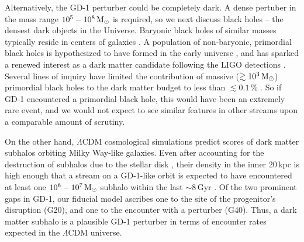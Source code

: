 \documentclass[twocolumn]{aastex62}
\begin{document}
Alternatively, the GD-1 perturber could be completely dark.
A dense pertuber in the mass range $10^5-10^8\,\rm M_\odot$ is required, so we next discuss black holes -- the densest dark objects in the Universe.
Baryonic black holes of similar masses typically reside in centers of galaxies \citep[the mass of Milky Way's supermassive black hole, Sgr A$^\star$, is $\approx4\times10^6\,\rm M_\odot$][]{boehle2016}.
A population of non-baryonic, primordial black holes is hypothesized to have formed in the early universe \citep{carr1974}, and has sparked a renewed interest as a dark matter candidate following the LIGO detections \citep{bird2016}.
Several lines of inquiry have limited the contribution of massive ($\gtrsim10^3\,\rm M_\odot$) primordial black holes to the dark matter budget to less than $\lesssim0.1\,\%$ \citep[and references within]{carr2016}.
So if GD-1 encountered a primordial black hole, this would have been an extremely rare event, and we would not expect to see similar features in other streams upon a comparable amount of scrutiny.

On the other hand, $\Lambda$CDM cosmological simulations predict scores of dark matter subhalos orbiting Milky Way-like galaxies.
Even after accounting for the destruction of subhalos due to the stellar disk \citep{donghia2010,gk2017}, their density in the inner 20\,kpc is high enough that a stream on a GD-1-like orbit is expected to have encountered at least one $10^6-10^7\rm\, M_\odot$ subhalo within the last $\sim8$\,Gyr \citep{erkal2016}.
Of the two prominent gaps in GD-1, our fiducial model ascribes one to the site of the progenitor's disruption (G20), and one to the encounter with a perturber (G40).
Thus, a dark matter subhalo is a plausible GD-1 perturber in terms of encounter rates expected in the $\Lambda$CDM universe.
\end{document}
